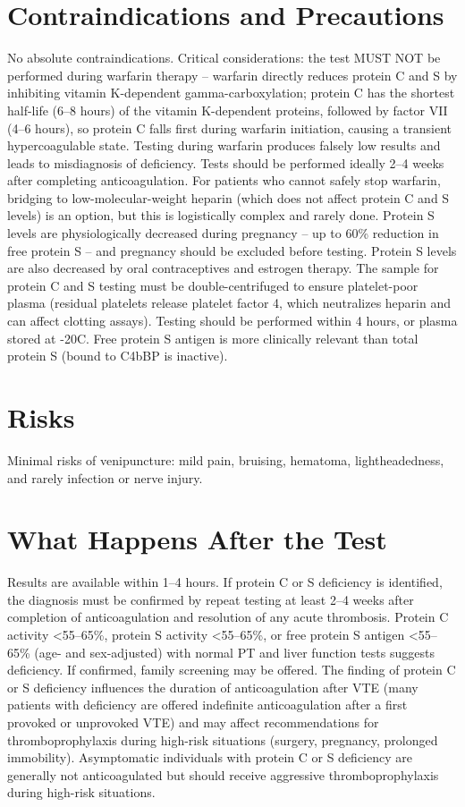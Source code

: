 \section*{Contraindications and Precautions}
No absolute contraindications. Critical considerations: the test MUST NOT be performed during warfarin therapy -- warfarin directly reduces protein C and S by inhibiting vitamin K-dependent gamma-carboxylation; protein C has the shortest half-life (6--8 hours) of the vitamin K-dependent proteins, followed by factor VII (4--6 hours), so protein C falls first during warfarin initiation, causing a transient hypercoagulable state. Testing during warfarin produces falsely low results and leads to misdiagnosis of deficiency. Tests should be performed ideally 2--4 weeks after completing anticoagulation. For patients who cannot safely stop warfarin, bridging to low-molecular-weight heparin (which does not affect protein C and S levels) is an option, but this is logistically complex and rarely done. Protein S levels are physiologically decreased during pregnancy -- up to 60\% reduction in free protein S -- and pregnancy should be excluded before testing. Protein S levels are also decreased by oral contraceptives and estrogen therapy. The sample for protein C and S testing must be double-centrifuged to ensure platelet-poor plasma (residual platelets release platelet factor 4, which neutralizes heparin and can affect clotting assays). Testing should be performed within 4 hours, or plasma stored at -20\textdegree{}C. Free protein S antigen is more clinically relevant than total protein S (bound to C4bBP is inactive).

\section*{Risks}
Minimal risks of venipuncture: mild pain, bruising, hematoma, lightheadedness, and rarely infection or nerve injury.

\section*{What Happens After the Test}
Results are available within 1--4 hours. If protein C or S deficiency is identified, the diagnosis must be confirmed by repeat testing at least 2--4 weeks after completion of anticoagulation and resolution of any acute thrombosis. Protein C activity <55--65\%, protein S activity <55--65\%, or free protein S antigen <55--65\% (age- and sex-adjusted) with normal PT and liver function tests suggests deficiency. If confirmed, family screening may be offered. The finding of protein C or S deficiency influences the duration of anticoagulation after VTE (many patients with deficiency are offered indefinite anticoagulation after a first provoked or unprovoked VTE) and may affect recommendations for thromboprophylaxis during high-risk situations (surgery, pregnancy, prolonged immobility). Asymptomatic individuals with protein C or S deficiency are generally not anticoagulated but should receive aggressive thromboprophylaxis during high-risk situations.

